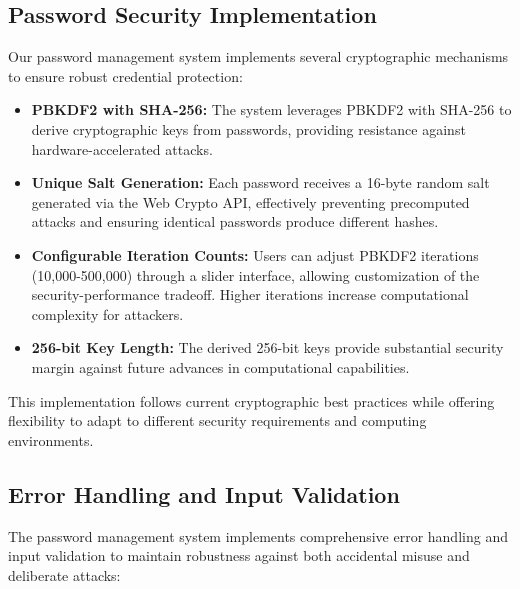 \documentclass[11pt,a4paper]{article}
\begin{document}
\subsection{Password Security Implementation}
Our password management system implements several cryptographic mechanisms to ensure robust credential protection:
\begin{itemize}
  \item \textbf{PBKDF2 with SHA-256:} The system leverages PBKDF2 with SHA-256 to derive cryptographic keys from passwords, providing resistance against hardware-accelerated attacks.
  \item \textbf{Unique Salt Generation:} Each password receives a 16-byte random salt generated via the Web Crypto API, effectively preventing precomputed attacks and ensuring identical passwords produce different hashes.
  \item \textbf{Configurable Iteration Counts:} Users can adjust PBKDF2 iterations (10,000-500,000) through a slider interface, allowing customization of the security-performance tradeoff. Higher iterations increase computational complexity for attackers.
  \item \textbf{256-bit Key Length:} The derived 256-bit keys provide substantial security margin against future advances in computational capabilities.
\end{itemize}

This implementation follows current cryptographic best practices while offering flexibility to adapt to different security requirements and computing environments.

\subsection{Error Handling and Input Validation}

The password management system implements comprehensive error handling and input validation to maintain robustness against both accidental misuse and deliberate attacks:
\end{document}
